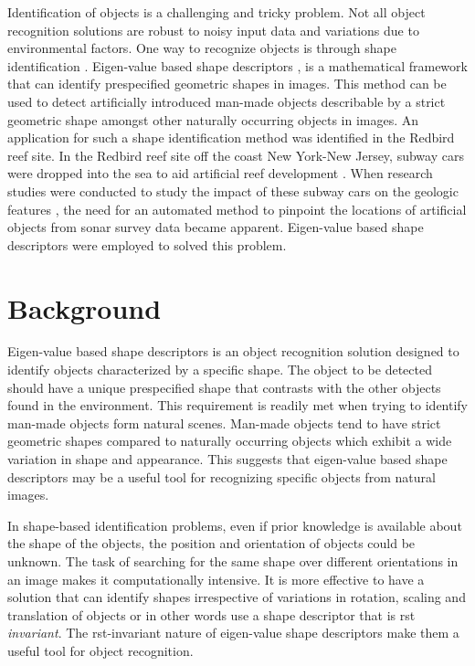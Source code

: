 \documentclass {udthesis}
\begin{document}
Identification of objects is a challenging and tricky problem. Not all object recognition solutions are robust to noisy input data and variations due to environmental factors. One way to recognize objects is through shape identification \cite{shape_survey}. Eigen-value based shape descriptors \cite{khabou,zuliani}, is a mathematical framework that can identify prespecified geometric shapes in images. This method can be used to detect artificially introduced man-made objects describable by a strict geometric shape amongst other naturally occurring objects in images. An application for such a shape identification method was identified in the Redbird reef site. In the Redbird reef site off the coast New York-New Jersey, subway cars were dropped into the sea to aid artificial reef development \cite{redbird1, redbird2}. When research studies were conducted to study the impact of these subway cars on the geologic features \cite{redbird_nicole, redbird_art}, the need for an automated method to pinpoint the 
locations of artificial objects 
from sonar survey data became apparent. Eigen-value based shape descriptors were employed to solved this problem.


\section{Background}

Eigen-value based shape descriptors is an object recognition solution designed to identify objects characterized by a specific shape. The object to be detected should have a unique prespecified shape that contrasts with the other objects found in the environment. This requirement is readily met when trying to identify man-made objects form natural scenes. Man-made objects tend to have strict geometric shapes compared to naturally occurring objects which exhibit a wide variation in shape and appearance. This suggests that eigen-value based shape descriptors may be a useful tool for recognizing specific objects from natural images.

In shape-based identification problems, even if prior knowledge is available about the shape of the objects, the position and orientation of objects could be unknown. The task of searching for the same shape over different orientations in an image makes it computationally intensive. It is more effective to have a solution that can identify shapes irrespective of variations in rotation, scaling and translation of objects or in other words use a shape descriptor that is \gls{rst} \textit{invariant}. The \gls{rst}-invariant nature of eigen-value shape descriptors make them a useful tool for object recognition. 
\end{document}

